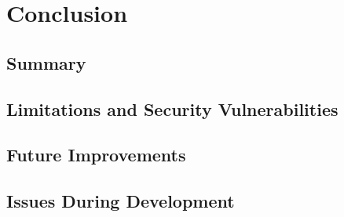 \chapter[Conclusion]{Conclusion}
\label{Chap:Conclusion}

\section{Summary}
\section{Limitations and Security Vulnerabilities}
\section{Future Improvements}
\section{Issues During Development}